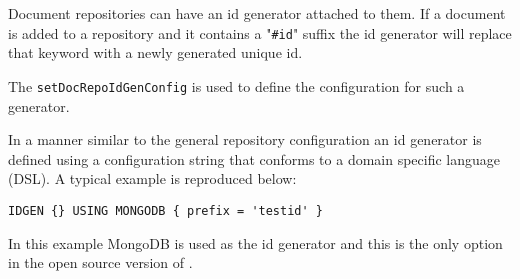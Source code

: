 Document repositories can have an id generator attached to them. If a document is added to
a repository and it contains a "\verb+#id+" suffix the id generator will replace that keyword with
a newly generated unique id.

The \verb+setDocRepoIdGenConfig+ is used to define the configuration for such a generator.

In a manner similar to the general repository configuration an id generator is defined using
a configuration string that conforms to a domain specific language (DSL). A typical example is
reproduced below:

\begin{verbatim}
IDGEN {} USING MONGODB { prefix = 'testid' }
\end{verbatim}

In this example MongoDB is used as the id generator and this is the only option in the open
source version of \Rapture.
